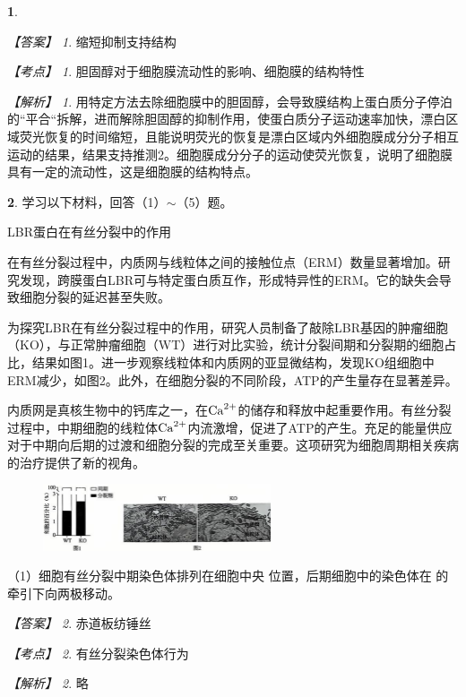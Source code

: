 \documentclass[UTF8, 10pt, a4paper, oneside]{ctexart}
\newcommand{\blank}{ \underbar{\quad$\blacktriangle$\quad} }%
\newcommand{\fs}[1]{{\fangsong #1}}%
\newcommand{\hei}[1]{{\heiti #1}}
\newcommand{\circled}[1]{{\small{\textcircled{\tiny{#1}}}}}%
\theoremstyle{definition}
\newtheorem{exercise}{}
\theoremstyle{remark}
\newtheorem*{answer}{【答案】}
\newtheorem*{point}{【考点】}      %
\newtheorem*{explanation}{【解析】}     %
\theoremstyle{plain}
\begin{document}
\begin{exercise}
    \begin{answer}
        缩短\qquad 抑制\qquad 支持\qquad 结构
    \end{answer}
    \begin{point}
        胆固醇对于细胞膜流动性的影响、细胞膜的结构特性
    \end{point}
    \begin{explanation}
        用特定方法去除细胞膜中的胆固醇，会导致膜结构上蛋白质分子停泊的“平合“拆解，进而解除胆固醇的抑制作用，使蛋白质分子运动速率加快，漂白区域荧光恢复的时间缩短，且能说明荧光的恢复是漂白区域内外细胞膜成分分子相互运动的结果，结果支持推测\circled{2}。细胞膜成分分子的运动使荧光恢复，说明了细胞膜具有一定的流动性，这是细胞膜的结构特点。
    \end{explanation}
\end{exercise}
\begin{exercise}
学习以下材料，回答（1）$\sim$（5）题。
\begin{center}
    \hei{LBR蛋白在有丝分裂中的作用}
\end{center}
{\kaishu

在有丝分裂过程中，内质网与线粒体之间的接触位点（ERM）数量显著增加。研究发现，跨膜蛋白LBR可与特定蛋白质互作，形成特异性的ERM。它的缺失会导致细胞分裂的延迟甚至失败。

为探究LBR在有丝分裂过程中的作用，研究人员制备了敲除LBR基因的肿瘤细胞（KO），与正常肿瘤细胞（WT）进行对比实验，统计分裂间期和分裂期的细胞占比，结果如图1。进一步观察线粒体和内质网的亚显微结构，发现KO组细胞中ERM减少，如图2。此外，在细胞分裂的不同阶段，ATP的产生量存在显著差异。

内质网是真核生物中的钙库之一，在$\ce{Ca^2+}$的储存和释放中起重要作用。有丝分裂过程中，中期细胞的线粒体$\ce{Ca^2+}$内流激增，促进了ATP的产生。充足的能量供应对于中期向后期的过渡和细胞分裂的完成至关重要。这项研究为细胞周期相关疾病的治疗提供了新的视角。
}
\begin{figure}[h!]
    \centering
    \includegraphics[width=0.6\textwidth]{assists/17-1.jpg}
\end{figure}

（1）细胞有丝分裂中期染色体排列在细胞中央\blank 位置，后期细胞中的染色体在\blank 的牵引下向两极移动。

\begin{answer}
    赤道板\qquad 纺锤丝
\end{answer}
\begin{point}
    有丝分裂染色体行为
\end{point}
\begin{explanation}
    \fs{略}
\end{explanation}


\end{exercise}
\end{document}
